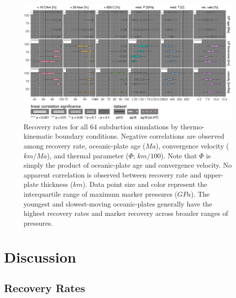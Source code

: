 \begin{landscape}




\begin{figure}[htbp]

{\centering \includegraphics[width=1\linewidth,]{assets/figs/chpt4/correlations_comp} 

}

\caption[Recovery rates for all 64 subduction simulations]{Recovery rates for all 64 subduction simulations by thermo-kinematic boundary conditions. Negative correlations are observed among recovery rate, oceanic-plate age ($Ma$), convergence velocity ($km/Ma$), and thermal parameter ($\Phi$; $km/100$). Note that $\Phi$ is simply the product of oceanic-plate age and convergence velocity. No apparent correlation is observed between recovery rate and upper-plate thickness ($km$). Data point size and color represent the interquartile range of maximum marker pressures ($GPa$). The youngest and slowest-moving oceanic-plates generally have the highest recovery rates and marker recovery across broader ranges of pressures.}\label{fig:corrComp}
\end{figure}


\end{landscape}

\hypertarget{chpt4Discussion}{%
\section{Discussion}\label{chpt4Discussion}}

\hypertarget{recovery-rates-1}{%
\subsection{Recovery Rates}\label{recovery-rates-1}}

